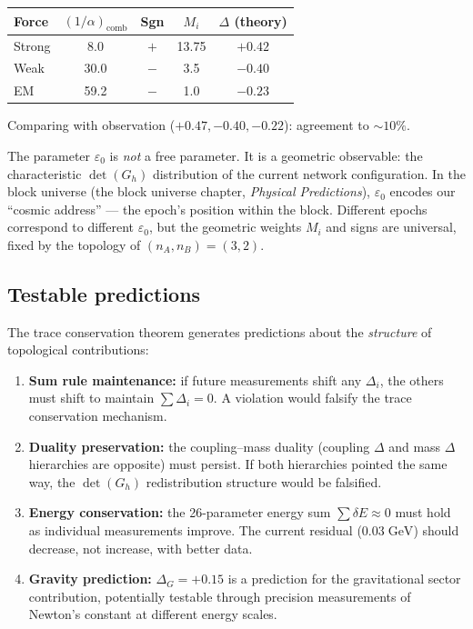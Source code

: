 \documentclass[12pt]{article}
\theoremstyle{remark}
\theoremstyle{definition}
\begin{document}
\begin{center}
\begin{tabular}{lcccc}
\hline
Force & $(1/\alpha)_\text{comb}$ & Sgn & $M_i$ & $\Delta$ (theory) \\
\hline
Strong & 8.0 & $+$ & 13.75 & $+0.42$ \\
Weak & 30.0 & $-$ & 3.5 & $-0.40$ \\
EM & 59.2 & $-$ & 1.0 & $-0.23$ \\
\hline
\end{tabular}
\end{center}

Comparing with observation ($+0.47, -0.40, -0.22$): agreement to $\sim 10\%$.

The parameter $\varepsilon_0$ is \emph{not} a free parameter. It is a geometric observable: the characteristic $\det(G_h)$ distribution of the current network configuration. In the block universe (the block universe chapter, \textit{Physical Predictions}), $\varepsilon_0$ encodes our ``cosmic address'' --- the epoch's position within the block. Different epochs correspond to different $\varepsilon_0$, but the geometric weights $M_i$ and signs are universal, fixed by the topology of $(n_A, n_B) = (3, 2)$.

\subsection{Testable predictions}

The trace conservation theorem generates predictions about the \emph{structure} of topological contributions:

\begin{enumerate}
\item \textbf{Sum rule maintenance:} if future measurements shift any $\Delta_i$, the others must shift to maintain $\sum \Delta_i = 0$. A violation would falsify the trace conservation mechanism.

\item \textbf{Duality preservation:} the coupling--mass duality (coupling $\Delta$ and mass $\Delta$ hierarchies are opposite) must persist. If both hierarchies pointed the same way, the $\det(G_h)$ redistribution structure would be falsified.

\item \textbf{Energy conservation:} the 26-parameter energy sum $\sum \delta E \approx 0$ must hold as individual measurements improve. The current residual ($0.03\;\text{GeV}$) should decrease, not increase, with better data.

\item \textbf{Gravity prediction:} $\Delta_G = +0.15$ is a prediction for the gravitational sector contribution, potentially testable through precision measurements of Newton's constant at different energy scales.
\end{enumerate}
\end{document}
